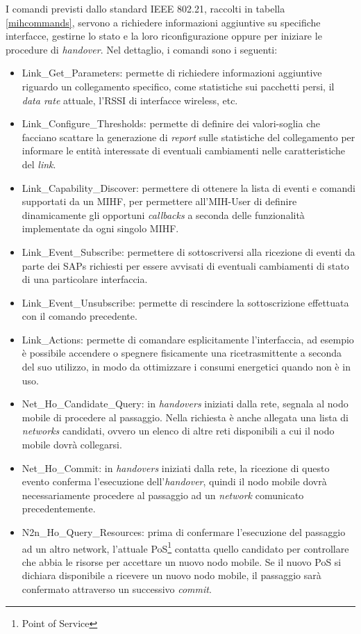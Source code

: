 I comandi previsti dallo standard IEEE 802.21, raccolti in tabella \ref{mihcommands}, servono a richiedere informazioni aggiuntive su specifiche interfacce, gestirne lo stato e la loro riconfigurazione oppure per iniziare le procedure di {\em handover}. Nel dettaglio, i comandi sono i seguenti:
\begin{itemize}
\item Link\_Get\_Parameters: permette di richiedere informazioni aggiuntive riguardo un collegamento specifico, come statistiche sui pacchetti persi, il {\em data rate} attuale, l'RSSI di interfacce wireless, etc.
\item Link\_Configure\_Thresholds: permette di definire dei valori-soglia che facciano scattare la generazione di {\em report} sulle statistiche del collegamento per informare le entità interessate di eventuali cambiamenti nelle caratteristiche del {\em link}.
\item Link\_Capability\_Discover: permettere di ottenere la lista di eventi e comandi supportati da un MIHF, per permettere all'MIH-User di definire dinamicamente gli opportuni {\em callbacks} a seconda delle funzionalità implementate da ogni singolo MIHF.
\item Link\_Event\_Subscribe: permettere di sottoscriversi alla ricezione di eventi da parte dei SAPs richiesti per essere avvisati di eventuali cambiamenti di stato di una particolare interfaccia.
\item Link\_Event\_Unsubscribe: permette di rescindere la sottoscrizione effettuata con il comando precedente.
\item Link\_Actions: permette di comandare esplicitamente l'interfaccia, ad esempio è possibile accendere o spegnere fisicamente una ricetrasmittente a seconda del suo utilizzo, in modo da ottimizzare i consumi energetici quando non è in uso.
\item Net\_Ho\_Candidate\_Query: in {\em handovers} iniziati dalla rete, segnala al nodo mobile di procedere al passaggio. Nella richiesta è anche allegata una lista di {\em networks} candidati, ovvero un elenco di altre reti disponibili a cui il nodo mobile dovrà collegarsi.
\item Net\_Ho\_Commit: in {\em handovers} iniziati dalla rete, la ricezione di questo evento conferma l'esecuzione dell'{\em handover}, quindi il nodo mobile dovrà necessariamente procedere al passaggio ad un {\em network} comunicato precedentemente.
\item N2n\_Ho\_Query\_Resources: prima di confermare l'esecuzione del passaggio ad un altro network, l'attuale PoS\footnote{Point of Service} contatta quello candidato per controllare che abbia le risorse per accettare un nuovo nodo mobile. Se il nuovo PoS si dichiara disponibile a ricevere un nuovo nodo mobile, il passaggio sarà confermato attraverso un successivo {\em commit}.

\end{itemize}
